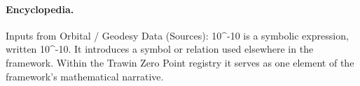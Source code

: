 \paragraph{Encyclopedia.}
Inputs from Orbital / Geodesy Data (Sources): 10\textasciicircum{}-10 is a symbolic expression, written 10\textasciicircum{}-10. It introduces a symbol or relation used elsewhere in the framework. Within the Trawin Zero Point registry it serves as one element of the framework's mathematical narrative.
